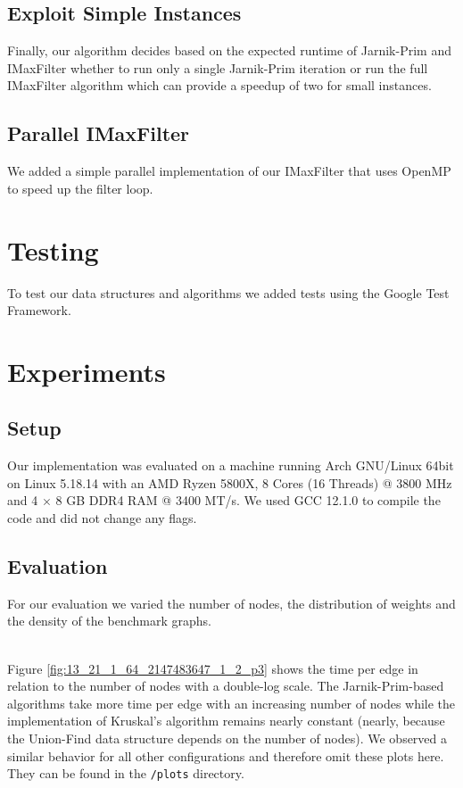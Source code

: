 \documentclass{article}
\begin{document}
\subsection{Exploit Simple Instances}
\label{sec:simple_instances}
Finally, our algorithm decides based on the expected runtime of Jarnik-Prim and IMaxFilter whether to run only a single Jarnik-Prim iteration or run the full IMaxFilter algorithm which can provide a speedup of two for small instances.

\subsection{Parallel IMaxFilter}
We added a simple parallel implementation of our IMaxFilter that uses OpenMP to speed up the filter loop.

\section{Testing}
To test our data structures and algorithms we added tests using the Google Test Framework.

\section{Experiments}

\subsection{Setup}
Our implementation was evaluated on a machine running Arch GNU/Linux 64bit on Linux 5.18.14 with an AMD Ryzen 5800X, 8 Cores (16 Threads) @ 3800 MHz and 4 $\times$ 8 GB DDR4 RAM @ 3400 MT/s.
We used GCC 12.1.0 to compile the code and did not change any flags.

\subsection{Evaluation}

For our evaluation we varied the number of nodes, the distribution of weights and the density of the benchmark graphs.

\noindent \\
Figure \ref{fig:13_21_1_64_2147483647_1_2_p3} shows the time per edge in relation to the number of nodes with a double-log scale.
The Jarnik-Prim-based algorithms take more time per edge with an increasing number of nodes while the implementation of Kruskal's algorithm remains nearly constant (nearly, because the Union-Find data structure depends on the number of nodes).
We observed a similar behavior for all other configurations and therefore omit these plots here.
They can be found in the \texttt{/plots} directory.
\end{document}
